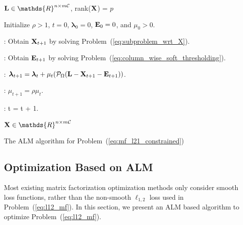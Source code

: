 \documentclass[10pt,twocolumn,letterpaper]{article}
\def\calP{\mathcal{P}}
\def\bE{{\bf E}}
\def\blambda{{\bm \lambda}}
\def\calC{{\mathcal{C}}}
\def\bL{{\bf L}}
\def\dsR{\mathds{R}}
\def\bX{{\bf X}}
\def\bX{{\bf X}}
\begin{document}
\begin{algorithm}[ht]

\begin{algorithmic}

\REQUIRE $\bL \in \dsR^{n \times m\calC}$, rank($\bX$) = $p$

\STATE Initialize $\rho > 1$, $t = 0$, $\blambda_{0} = 0$, $\bE_{0} = 0$, and $\mu_{0} > 0$.

\WHILE{$t = 0$ or $L_1(\bE_{t+1}-\bE_{t}) \geq \epsilon$}


    : Obtain $\bX_{t+1}$ by solving Problem~(\ref{eq:subproblem_wrt_X}).

    : Obtain $\bE_{t+1}$ by solving Problem~(\ref{eq:column_wise_soft_thresholding}).

  \ENDWHILE

  : $\blambda_{t+1} = \blambda_{t} + \mu_{t} (\calP_{\Omega}{(\bL - \bX_{t+1} - \bE_{t+1})})$.

  : $\mu_{t+1} = \rho \mu_{t}$.

  : t = t + 1.

\ENDWHILE

\ENSURE $\bX \in \dsR^{n \times m\calC}$

\end{algorithmic}
\caption{The ALM algorithm for Problem~(\ref{eq:mf_l21_constrained})}
\label{alg:alm_mf}
\end{algorithm}

\subsection{Optimization Based on ALM}

Most existing matrix factorization optimization methods only consider smooth loss functions, rather than the non-smooth $\ell_{1,2}$ loss used in Problem~(\ref{eq:l12_mf}).
In this section, we present an ALM based algorithm to optimize Problem~(\ref{eq:l12_mf}).
\end{document}
